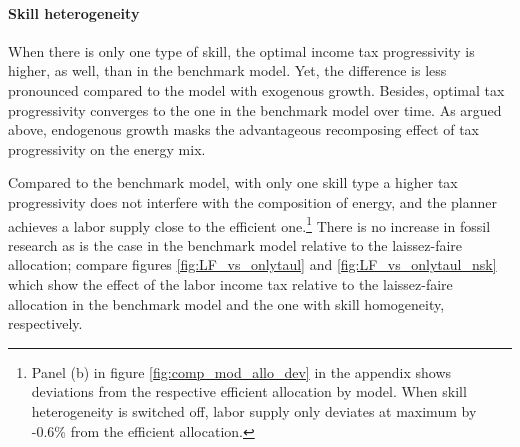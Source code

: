 \paragraph{Skill heterogeneity}
When there is only one type of skill, the optimal income tax progressivity is higher, as well, than in the benchmark model. Yet, the difference is less pronounced compared to the model with exogenous growth. Besides, optimal tax progressivity converges to the one in the benchmark model over time. 
As argued above, endogenous growth masks the advantageous recomposing effect of tax progressivity on the energy mix. 

Compared to the benchmark model, with only one skill type a higher tax progressivity does not interfere with the composition of energy, and the planner achieves a labor supply close to the efficient one.\footnote{ Panel (b) in figure \ref{fig:comp_mod_allo_dev} in the appendix shows deviations from the respective efficient allocation by model. When skill heterogeneity is switched off, labor supply only deviates at maximum by -0.6\% from the efficient allocation. }
There is no increase in fossil research as is the case in the benchmark model relative to the laissez-faire allocation; compare figures \ref{fig:LF_vs_onlytaul} and \ref{fig:LF_vs_onlytaul_nsk} which show the effect of the labor income tax relative to the laissez-faire allocation in the benchmark model and the one with skill homogeneity, respectively.


